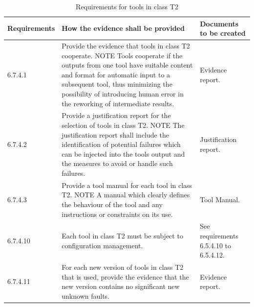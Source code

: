 \documentclass{template/openetcs_report}
\begin{document}
{\footnotesize\sffamily\centering
\begin{longtable}{|p{2cm}|p{9cm}|p{3cm}|}
\caption{Requirements for tools in class T2}\\
\hline
\bfseries Requirements & \bfseries How the evidence shall be provided & \bfseries Documents to be created\\
\hline
\hline
\endhead
\hline
\endfoot

6.7.4.1 & Provide the evidence that tools in class T2 cooperate.
\linebreak
\linebreak 
NOTE \linebreak
Tools cooperate if the outputs from one tool have suitable content and format for automatic input to a subsequent tool, thus minimizing the possibility of introducing human error in the reworking of intermediate results. & Evidence report.\\ 
\hline
6.7.4.2 & Provide a justification report for the selection of tools in class T2.
\linebreak
\linebreak 
NOTE \linebreak
The justification report shall include the identification of potential failures which can be injected into the tools output and the measures to avoid or handle such failures. & Justification report.\\ 
\hline
6.7.4.3 & Provide a tool manual for each tool in class T2.
\linebreak
\linebreak
NOTE \linebreak
A manual which clearly defines the behaviour of the tool and any instructions or constraints on its use. & Tool Manual.\\ 
\hline
6.7.4.10 & Each tool in class T2 must be subject to configuration management. & See requirements 6.5.4.10 to 6.5.4.12.\\ 
\hline
6.7.4.11 & For each new version of tools in class T2 that is used, provide the evidence that the new version contains no significant new unknown faults. & Evidence report.\\ 
\hline
\end{longtable}}
\end{document}
